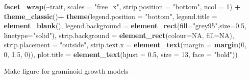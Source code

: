 \documentclass[
]{article}
\newenvironment{Shaded}{\begin{snugshade}}{\end{snugshade}}
\newcommand{\DataTypeTok}[1]{\textcolor[rgb]{0.13,0.29,0.53}{#1}}
\newcommand{\DecValTok}[1]{\textcolor[rgb]{0.00,0.00,0.81}{#1}}
\newcommand{\FloatTok}[1]{\textcolor[rgb]{0.00,0.00,0.81}{#1}}
\newcommand{\KeywordTok}[1]{\textcolor[rgb]{0.13,0.29,0.53}{\textbf{#1}}}
\newcommand{\NormalTok}[1]{#1}
\newcommand{\OperatorTok}[1]{\textcolor[rgb]{0.81,0.36,0.00}{\textbf{#1}}}
\newcommand{\OtherTok}[1]{\textcolor[rgb]{0.56,0.35,0.01}{#1}}
\newcommand{\StringTok}[1]{\textcolor[rgb]{0.31,0.60,0.02}{#1}}
\begin{document}
\begin{Shaded}
\begin{Highlighting}[]
\StringTok{  }\KeywordTok{facet\_wrap}\NormalTok{(}\OperatorTok{\textasciitilde{}}\NormalTok{trait, }\DataTypeTok{scales =} \StringTok{"free\_x"}\NormalTok{, }\DataTypeTok{strip.position =}  \StringTok{"bottom"}\NormalTok{, }\DataTypeTok{ncol =} \DecValTok{1}\NormalTok{) }\OperatorTok{+}
\StringTok{  }\KeywordTok{theme\_classic}\NormalTok{()}\OperatorTok{+}
\StringTok{  }\KeywordTok{theme}\NormalTok{(}\DataTypeTok{legend.position =} \StringTok{"bottom"}\NormalTok{, }\DataTypeTok{legend.title =} \KeywordTok{element\_blank}\NormalTok{(), }\DataTypeTok{legend.background =} \KeywordTok{element\_rect}\NormalTok{(}\DataTypeTok{fill=}\StringTok{"grey95"}\NormalTok{,}\DataTypeTok{size=}\FloatTok{0.5}\NormalTok{, }\DataTypeTok{linetype=}\StringTok{"solid"}\NormalTok{), }\DataTypeTok{strip.background =} \KeywordTok{element\_rect}\NormalTok{(}\DataTypeTok{colour=}\OtherTok{NA}\NormalTok{, }\DataTypeTok{fill=}\OtherTok{NA}\NormalTok{), }\DataTypeTok{strip.placement =} \StringTok{"outside"}\NormalTok{, }\DataTypeTok{strip.text.x =} \KeywordTok{element\_text}\NormalTok{(}\DataTypeTok{margin =} \KeywordTok{margin}\NormalTok{(}\DecValTok{0}\NormalTok{, }\DecValTok{0}\NormalTok{, }\FloatTok{1.5}\NormalTok{, }\DecValTok{0}\NormalTok{)), }\DataTypeTok{plot.title =} \KeywordTok{element\_text}\NormalTok{(}\DataTypeTok{hjust =} \FloatTok{0.5}\NormalTok{, }\DataTypeTok{size =} \DecValTok{13}\NormalTok{, }\DataTypeTok{face =} \StringTok{"bold"}\NormalTok{))}
\end{Highlighting}
\end{Shaded}

Make figure for graminoid growth models
\end{document}

